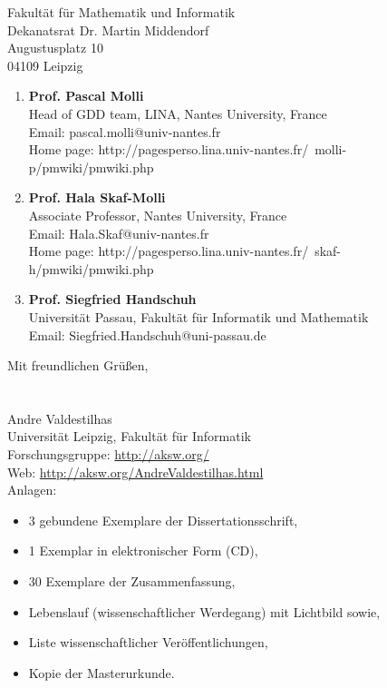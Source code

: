 \documentclass[DIN, pagenumber=false, parskip=half, fromalign=right, fromphone=true, fromemail=true, fromurl=false, fromlogo=false, fromrule=false, 11pt]{scrlttr2}
\begin{document}
\begin{letter}{Fakult\"at f\"ur Mathematik und Informatik \\ Dekanatsrat Dr. Martin Middendorf \\Augustusplatz 10 \\ 04109 Leipzig }
\begin{enumerate}
\item \textbf{Prof. Pascal Molli} \\
Head of GDD team, LINA, 
Nantes University, France  \\
Email: pascal.molli@univ-nantes.fr \\
Home page: http://pagesperso.lina.univ-nantes.fr/~molli-p/pmwiki/pmwiki.php

\item \textbf{Prof. Hala Skaf-Molli} \\
Associate Professor, 
Nantes University, France  \\
Email: Hala.Skaf@univ-nantes.fr \\
Home page: http://pagesperso.lina.univ-nantes.fr/~skaf-h/pmwiki/pmwiki.php


\item \textbf{Prof. Siegfried Handschuh}\\
Universität Passau, Fakultät für Informatik und Mathematik \\
Email: Siegfried.Handschuh@uni-passau.de\\



\end{enumerate}

Mit freundlichen Gr\"u\ss{}en,\\
~ \\
~ \\
Andre Valdestilhas  \\
Universit\"at Leipzig, Fakult\"at f\"ur Informatik \\
Forschungsgruppe: \url{http://aksw.org/} \\
Web: \url{http://aksw.org/AndreValdestilhas.html} \\
\newline
Anlagen:
\begin{itemize}
  \item 3 gebundene Exemplare der Dissertationsschrift,
  \item 1 Exemplar in elektronischer Form (CD),
  \item 30 Exemplare der Zusammenfassung,
  \item Lebenslauf (wissenschaftlicher Werdegang) mit Lichtbild sowie,
  \item Liste wissenschaftlicher Ver{\"o}ffentlichungen,
  \item Kopie der Masterurkunde.
\end{itemize}

\end{letter}
\end{document}
